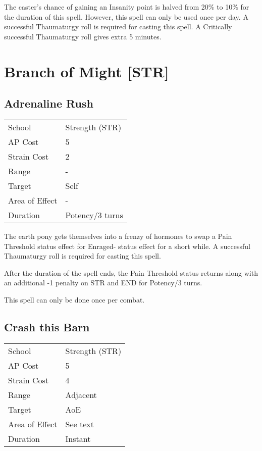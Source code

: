\documentclass[11pt,a4paper,twocolumn]{book}
\begin{document}
The caster's chance of gaining an Insanity point is halved from 20\% to 10\% for the duration of this spell. However, this spell can only be used once per day. A successful Thaumaturgy roll is required for casting this spell. A Critically successful Thaumaturgy roll gives extra 5 minutes.

\section*{Branch of Might [STR]}
\subsection*{Adrenaline Rush}
{
	\begin{tabu} to 75mm{| X[l,4] | X[l,7] |}
		\hline
		School 			& Strength (STR) 	\\
		AP Cost	      	& 5 				\\
		Strain Cost     & 2 				\\
		Range     		& - 				\\
		Target      	& Self 				\\
		Area of Effect  & - 	 			\\
		Duration     	& Potency/3 turns 	\\ \hline
	\end{tabu}
	
}

\medskip

The earth pony gets themselves into a frenzy of hormones to swap a Pain Threshold status effect for Enraged- status effect for a short while. A successful Thaumaturgy roll is required for casting this spell.

After the duration of the spell ends, the Pain Threshold status returns along with an additional -1 penalty on STR and END for Potency/3 turns.

This spell can only be done once per combat.

\vfill

\subsection*{Crash this Barn}
{
	\begin{tabu} to 75mm{| X[l,4] | X[l,7] |}
		\hline
		School 			& Strength (STR) 	\\
		AP Cost	      	& 5 				\\
		Strain Cost     & 4 				\\
		Range     		& Adjacent 			\\
		Target      	& AoE 				\\
		Area of Effect  & See text 	 		\\
		Duration     	& Instant 			\\ \hline
	\end{tabu}
	
}
\end{document}
